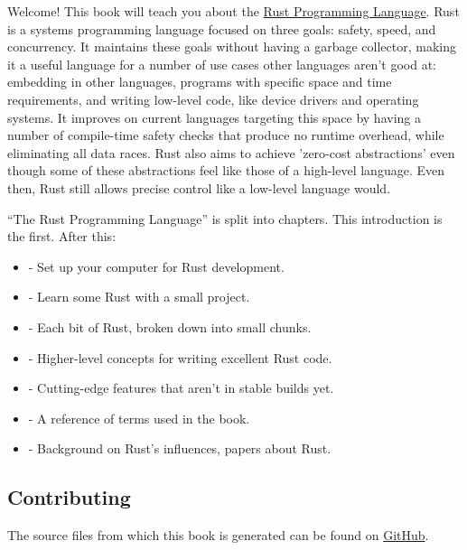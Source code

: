 Welcome! This book will teach you about the \href{https://www.rust-lang.org/}{Rust Programming Language}.
Rust is a systems programming language focused on three goals: safety, speed, and concurrency. It maintains 
these goals without having a garbage collector, making it a useful language for a number of use cases other 
languages aren't good at: embedding in other languages, programs with specific space and time requirements, 
and writing low-level code, like device drivers and operating systems. It improves on current languages targeting 
this space by having a number of compile-time safety checks that produce no runtime overhead, while eliminating 
all data races. Rust also aims to achieve 'zero-cost abstractions' even though some of these abstractions feel 
like those of a high-level language. Even then, Rust still allows precise control like a low-level language would.

\blank
\enquote{The Rust Programming Language} is split into chapters. This introduction is the first. After this:

\begin{itemize}
    \item{ - Set up your computer for Rust development.}
    \item{ - Learn some Rust with a small project.}
    \item{ - Each bit of Rust, broken down into small chunks.}
    \item{ - Higher-level concepts for writing excellent Rust code.}
    \item{ - Cutting-edge features that aren't in stable builds yet.}
    \item{ - A reference of terms used in the book.}
    \item{ - Background on Rust's influences, papers about Rust.}
\end{itemize}

\subsection*{Contributing}

The source files from which this book is generated can be found on
\href{https://github.com/rust-lang/rust/tree/master/src/doc/book}{GitHub}.